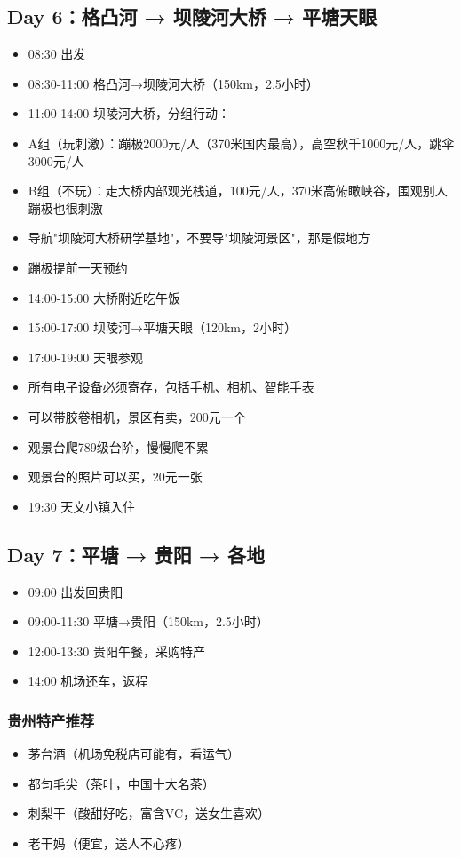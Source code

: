 \documentclass[12pt,a4paper,UTF8]{ctexart}
\begin{document}
\subsection{Day 6：格凸河 → 坝陵河大桥 → 平塘天眼}
\begin{itemize}
\item 08:30 出发
\item 08:30-11:00 格凸河→坝陵河大桥（150km，2.5小时）
\item 11:00-14:00 坝陵河大桥，分组行动：
\item A组（玩刺激）：蹦极2000元/人（370米国内最高），高空秋千1000元/人，跳伞3000元/人
\item B组（不玩）：走大桥内部观光栈道，100元/人，370米高俯瞰峡谷，围观别人蹦极也很刺激
\item 导航"坝陵河大桥研学基地"，不要导"坝陵河景区"，那是假地方
\item 蹦极提前一天预约
\item 14:00-15:00 大桥附近吃午饭
\item 15:00-17:00 坝陵河→平塘天眼（120km，2小时）
\item 17:00-19:00 天眼参观
\item 所有电子设备必须寄存，包括手机、相机、智能手表
\item 可以带胶卷相机，景区有卖，200元一个
\item 观景台爬789级台阶，慢慢爬不累
\item 观景台的照片可以买，20元一张
\item 19:30 天文小镇入住
\end{itemize}

\subsection{Day 7：平塘 → 贵阳 → 各地}
\begin{itemize}
\item 09:00 出发回贵阳
\item 09:00-11:30 平塘→贵阳（150km，2.5小时）
\item 12:00-13:30 贵阳午餐，采购特产
\item 14:00 机场还车，返程
\end{itemize}

\subsubsection{贵州特产推荐}
\begin{itemize}
\item 茅台酒（机场免税店可能有，看运气）
\item 都匀毛尖（茶叶，中国十大名茶）
\item 刺梨干（酸甜好吃，富含VC，送女生喜欢）
\item 老干妈（便宜，送人不心疼）
\end{itemize}
\end{document}
